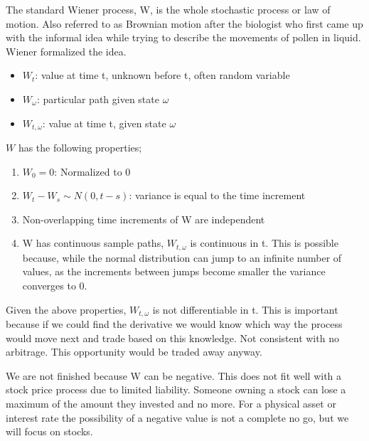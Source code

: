 \documentclass[12pt]{article}
\begin{document}
The standard Wiener process, W, is the whole stochastic process or law of
motion. Also referred to as Brownian motion after the biologist who first came
up with the informal idea while trying to describe the movements of pollen in
liquid. Wiener formalized the idea.
\begin{itemize}
    \item $W_t$: value at time t, unknown before t, often random variable
    \item $W_{\omega}$: particular path given state $\omega$
    \item $W_{t,\omega}$: value at time t, given state $\omega$
\end{itemize}
$W$ has the following properties;
\begin{enumerate}
\item $W_0=0$: Normalized to 0
\item $W_t-W_s \sim N(0, t-s)$: variance is equal to the time increment
\item Non-overlapping time increments of W are independent
\item W has continuous sample paths, $W_{t, \omega}$ is continuous in t. This
    is possible because, while the normal distribution can jump to an infinite
    number of values, as the increments between jumps become smaller the
    variance converges to 0.
\end{enumerate}

Given the above properties, $W_{t,\omega}$ is not differentiable in t. This is
important because if we could find the derivative we would know which way the
process would move next and trade based on this knowledge. Not consistent with
no arbitrage. This opportunity would be traded away anyway.

We are not finished because W can be negative. This does not fit well with a
stock price process due to limited liability. Someone owning a stock can lose a
maximum of the amount they invested and no more. For a physical asset or
interest rate the possibility of a negative value is not a complete no go, but
we will focus on stocks.
\end{document}
